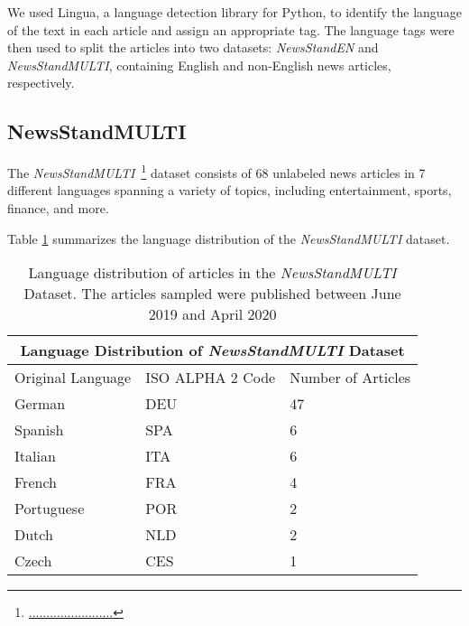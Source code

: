 
We used Lingua, a language detection library for Python, to identify the language of the text in each article and assign an appropriate tag.
The language tags were then used to split the articles into two datasets: \emph{NewsStandEN} and \emph{NewsStandMULTI}, containing English and non-English news articles, respectively.



\subsection{NewsStandMULTI}
The \emph{NewsStandMULTI}~\footnote{\url{........................}} dataset consists of 68 unlabeled news articles in 7 different languages spanning a variety of topics, including entertainment, sports, finance, and more.

Table \ref{table:newsstandlarge-stats} summarizes the language distribution of the \emph{NewsStandMULTI} dataset.

\begin{table}[ht!]
\centering
\begin{tabular}{ p{2.5cm} p{2cm} p{1.5cm}  }
 \multicolumn{3}{c}{\textbf{Language Distribution of \emph{NewsStandMULTI} Dataset}} \\
 \hline
 Original Language & ISO ALPHA 2 Code & Number of Articles\\
 \hline
 German             & DEU     & 47\\
 Spanish            & SPA     & 6\\
 Italian            & ITA     & 6\\
 French             & FRA     & 4\\
 Portuguese         & POR     & 2\\
 Dutch              & NLD     & 2\\
 Czech              & CES     & 1
\end{tabular}
\caption{Language distribution of articles in the \emph{NewsStandMULTI} Dataset. The articles sampled were published between June 2019 and April 2020}
\label{table:newsstandlarge-stats}
\end{table}







